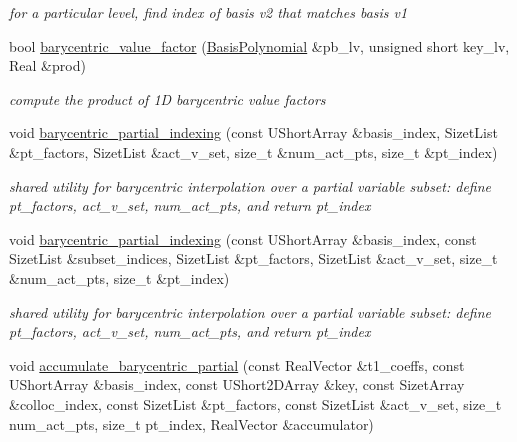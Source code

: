 \begin{DoxyCompactItemize}
\begin{DoxyCompactList}\small\item\em for a particular level, find index of basis v2 that matches basis v1 \end{DoxyCompactList}\item 
bool \hyperlink{classPecos_1_1SharedInterpPolyApproxData_a580885077877c95fd202178646466dd9}{barycentric\+\_\+value\+\_\+factor} (\hyperlink{classPecos_1_1BasisPolynomial}{Basis\+Polynomial} \&pb\+\_\+lv, unsigned short key\+\_\+lv, Real \&prod)\label{classPecos_1_1SharedInterpPolyApproxData_a580885077877c95fd202178646466dd9}

\begin{DoxyCompactList}\small\item\em compute the product of 1D barycentric value factors \end{DoxyCompactList}\item 
void \hyperlink{classPecos_1_1SharedInterpPolyApproxData_ad33329165f7aa11eebf4754fcb26b4cd}{barycentric\+\_\+partial\+\_\+indexing} (const U\+Short\+Array \&basis\+\_\+index, Sizet\+List \&pt\+\_\+factors, Sizet\+List \&act\+\_\+v\+\_\+set, size\+\_\+t \&num\+\_\+act\+\_\+pts, size\+\_\+t \&pt\+\_\+index)\label{classPecos_1_1SharedInterpPolyApproxData_ad33329165f7aa11eebf4754fcb26b4cd}

\begin{DoxyCompactList}\small\item\em shared utility for barycentric interpolation over a partial variable subset\+: define pt\+\_\+factors, act\+\_\+v\+\_\+set, num\+\_\+act\+\_\+pts, and return pt\+\_\+index \end{DoxyCompactList}\item 
void \hyperlink{classPecos_1_1SharedInterpPolyApproxData_a3621c913edc1a1b2c93996963461c4b1}{barycentric\+\_\+partial\+\_\+indexing} (const U\+Short\+Array \&basis\+\_\+index, const Sizet\+List \&subset\+\_\+indices, Sizet\+List \&pt\+\_\+factors, Sizet\+List \&act\+\_\+v\+\_\+set, size\+\_\+t \&num\+\_\+act\+\_\+pts, size\+\_\+t \&pt\+\_\+index)\label{classPecos_1_1SharedInterpPolyApproxData_a3621c913edc1a1b2c93996963461c4b1}

\begin{DoxyCompactList}\small\item\em shared utility for barycentric interpolation over a partial variable subset\+: define pt\+\_\+factors, act\+\_\+v\+\_\+set, num\+\_\+act\+\_\+pts, and return pt\+\_\+index \end{DoxyCompactList}\item 
void \hyperlink{classPecos_1_1SharedInterpPolyApproxData_acba09fe1d05ec5909443f2cd365ece97}{accumulate\+\_\+barycentric\+\_\+partial} (const Real\+Vector \&t1\+\_\+coeffs, const U\+Short\+Array \&basis\+\_\+index, const U\+Short2\+D\+Array \&key, const Sizet\+Array \&colloc\+\_\+index, const Sizet\+List \&pt\+\_\+factors, const Sizet\+List \&act\+\_\+v\+\_\+set, size\+\_\+t num\+\_\+act\+\_\+pts, size\+\_\+t pt\+\_\+index, Real\+Vector \&accumulator)\label{classPecos_1_1SharedInterpPolyApproxData_acba09fe1d05ec5909443f2cd365ece97}


\end{DoxyCompactItemize}
